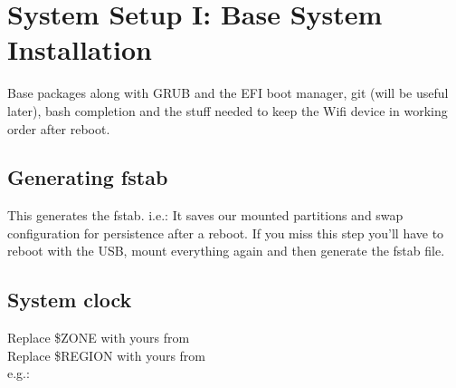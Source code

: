 
\section{System Setup I: Base System Installation}

\begin{blocksection}
    Base packages along with GRUB and the EFI boot manager, git (will be useful later), bash completion and the stuff needed to keep the Wifi device in working order after reboot.
\end{blocksection}

\subsection{Generating fstab}

\begin{blocksection}
    This generates the fstab. i.e.: It saves our mounted partitions and swap configuration for persistence after a reboot. If you miss this step you'll have to reboot with the USB, mount everything again and then generate the fstab file.
\end{blocksection}

\subsection{System clock}

\begin{blocksection}
    Replace \textcolor{codekeyword1}{\$ZONE} with yours from \\
    Replace \textcolor{codekeyword1}{\$REGION} with yours from \\
    e.g.: 
\end{blocksection}

